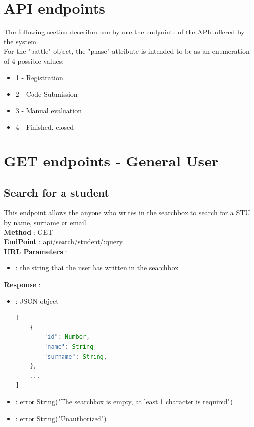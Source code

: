 \section{API endpoints}

\lstset{
    basicstyle=\ttfamily\footnotesize,
    showstringspaces=false,
    tabsize=2,
    breaklines=true
}

The following section describes one by one the endpoints of the APIs offered by the system.\\
For the "battle" object, the "phase" attribute is intended to be as an enumeration of 4 possible values:
\begin{itemize}
    \item 1 - Registration
    \item 2 - Code Submission
    \item 3 - Manual evaluation
    \item 4 - Finished, closed
\end{itemize}

\section*{GET endpoints - General User}

\subsection*{Search for a student}
This endpoint allows the anyone who writes in the searchbox to search for a STU by name, surname or email.\\
\textbf{Method} : GET \\
\textbf{EndPoint} : api/search/student/:query \\
\textbf{URL Parameters} :
\begin{itemize}
    \item {} : the string that the user has written in the searchbox\\
\end{itemize}
\textbf{Response} :
\begin{itemize}
    \item {} : JSON object
          \begin{lstlisting}[language=JavaScript, label={lst:jscode}, basicstyle=\ttfamily]
[
    {
        "id": Number,
        "name": String,
        "surname": String,
    },
    ...
]
            \end{lstlisting}
    \item {} : error String("The searchbox is empty, at least 1 character is required")
    \item {} : error String("Unauthorized")
\end{itemize}

